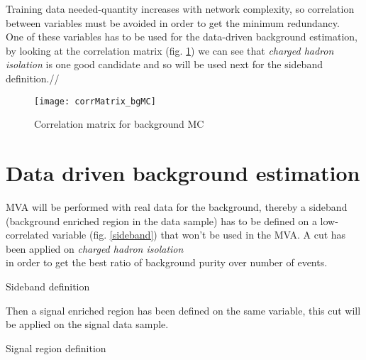 Training data needed-quantity increases with network complexity, so correlation between variables must be avoided in
order to get the minimum redundancy.\\
One of these variables has to be used for the data-driven background estimation, by looking at the correlation matrix
(fig. \ref{corrMatrix_bgMC}) we can see that \emph{charged hadron isolation} is one good candidate and so will be used next for the sideband
definition.//

\begin{figure}[ht!]
  \centering
  \texttt{[image: corrMatrix\_bgMC]}\\[1cm]
  \caption{Correlation matrix for background MC}
  \label{corrMatrix_bgMC}
\end{figure}

\section{Data driven background estimation}

MVA will be performed with real data for the background, thereby a sideband (background enriched region in the data sample) has to be defined on a low-correlated
variable (fig. \ref{sideband}) that won't be used in the MVA. A cut has been applied on \emph{charged hadron isolation}\\ in order to get the best ratio of background purity over number of events.
\begin{description}
	\item [Sideband definition]
\end{description}

Then a signal enriched region has been defined on the same variable, this cut will be applied on the signal data sample.
\begin{description}
	\item [Signal region definition]
\end{description}

